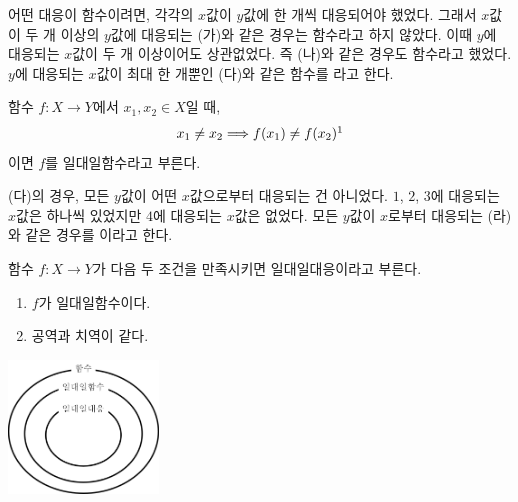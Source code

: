 \documentclass{oblivoir}
\begin{document}
어떤 대응이 함수이려면, 각각의 \(x\)값이 \(y\)값에 한 개씩 대응되어야 했었다.
그래서 \(x\)값이 두 개 이상의 \(y\)값에 대응되는 (가)와 같은 경우는 함수라고 하지 않았다.
이때 \(y\)에 대응되는 \(x\)값이 두 개 이상이어도 상관없었다.
즉 (나)와 같은 경우도 함수라고 했었다.
\(y\)에 대응되는 \(x\)값이 최대 한 개뿐인 (다)와 같은 함수를 라고 한다.
\begin{mdframed}
%
\label{various1}
함수 \(f:X\to Y\)에서 \(x_1,x_2\in X\)일 때,
\[x_1\neq x_2\Longrightarrow f(x_1)\neq f(x_2)\footnotemark\]
이면 \(f\)를 일대일함수라고 부른다.
\end{mdframed}

\bigskip\bigskip
(다)의 경우, 모든 \(y\)값이 어떤 \(x\)값으로부터 대응되는 건 아니었다.
\(1\), \(2\), \(3\)에 대응되는 \(x\)값은 하나씩 있었지만 \(4\)에 대응되는 \(x\)값은 없었다.
모든 \(y\)값이 \(x\)로부터 대응되는 (라)와 같은 경우를 이라고 한다.
\begin{mdframed}
%
\label{various2}
함수 \(f:X\to Y\)가 다음 두 조건을 만족시키면 일대일대응이라고 부른다.
\begin{enumerate}[label=\roman*)]
\item
\(f\)가 일대일함수이다.
\item
공역과 치역이 같다.
\end{enumerate}
\end{mdframed}
%
\begin{center}
\includegraphics[width=0.3\textwidth]{various_2}
\end{center}
\end{document}
